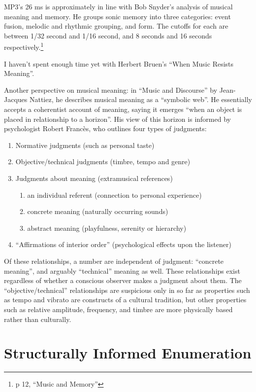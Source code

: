 \documentclass{thesis}
\begin{document}
	MP3's 26 ms is approximately in line with Bob Snyder's analysis of musical meaning and memory. He groups sonic memory into three categories: event fusion, melodic and rhythmic grouping, and form. The cutoffs for each are between 1/32 second and 1/16 second, and 8 seconds and 16 seconds respectively.\footnote{p 12, ``Music and Memory''}
	
I haven't spent enough time yet with Herbert Bruen's ``When Music Resists Meaning''.\cite{Bruen04}
	
	Another perspective on musical meaning: in ``Music and Discourse'' by Jean-Jacques Nattiez\cite{nattiez_music_1990}, he describes musical meaning as a ``symbolic web''. He essentially accepts a coherentist account of meaning, saying it emerges ``when an object is placed in relationship to a horizon''. His view of this horizon is informed by psychologist Robert Franc\`es, who outlines four types of judgments:
	
\begin{enumerate}
	\item Normative judgments (such as personal taste)
	\item Objective/technical judgments (timbre, tempo and genre)
	\item Judgments about meaning (extramusical references)
		\begin{enumerate}
			\item an individual referent (connection to personal experience)
			\item concrete meaning (naturally occurring sounds)
			\item abstract meaning (playfulness, serenity or hierarchy)
		\end{enumerate}
	\item ``Affirmations of interior order'' (psychological effects upon the listener)
\end{enumerate}

	Of these relationships, a number are independent of judgment: ``concrete meaning'', and arguably ``technical'' meaning as well. These relationships exist regardless of whether a conscious observer makes a judgment about them. The ``objective/technical'' relationships are suspicious only in so far as properties such as tempo and vibrato are constructs of a cultural tradition, but other properties such as relative amplitude, frequency, and timbre are more physically based rather than culturally.
	
\section{Structurally Informed Enumeration}
\end{document}
